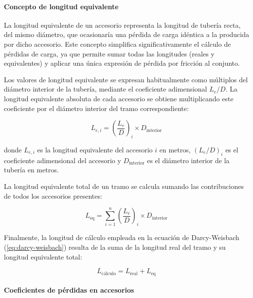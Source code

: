 \paragraph{Concepto de longitud equivalente}

La longitud equivalente de un accesorio representa la longitud de tubería recta, del mismo diámetro, que ocasionaría una pérdida de carga idéntica a la producida por dicho accesorio. Este concepto simplifica significativamente el cálculo de pérdidas de carga, ya que permite sumar todas las longitudes (reales y equivalentes) y aplicar una única expresión de pérdida por fricción al conjunto.

Los valores de longitud equivalente se expresan habitualmente como múltiplos del diámetro interior de la tubería, mediante el coeficiente adimensional $L_e/D$. La longitud equivalente absoluta de cada accesorio se obtiene multiplicando este coeficiente por el diámetro interior del tramo correspondiente:

\begin{equation}
	L_{e,i} = \left(\frac{L_e}{D}\right)_i \times D_{\text{interior}}
	\label{eq:longitud-equivalente-accesorio}
\end{equation}

\noindent donde $L_{e,i}$ es la longitud equivalente del accesorio $i$ en metros, $(L_e/D)_i$ es el coeficiente adimensional del accesorio y $D_{\text{interior}}$ es el diámetro interior de la tubería en metros.

La longitud equivalente total de un tramo se calcula sumando las contribuciones de todos los accesorios presentes:

\begin{equation}
	L_{\text{eq}} = \sum_{i=1}^{n} \left(\frac{L_e}{D}\right)_i \times D_{\text{interior}}
	\label{eq:longitud-equivalente-total}
\end{equation}

Finalmente, la longitud de cálculo empleada en la ecuación de Darcy-Weisbach (\autoref{eq:darcy-weisbach}) resulta de la suma de la longitud real del tramo y su longitud equivalente total:

\begin{equation}
	L_{\text{cálculo}} = L_{\text{real}} + L_{\text{eq}}
	\label{eq:longitud-calculo-total}
\end{equation}

\paragraph{Coeficientes de pérdidas en accesorios}

